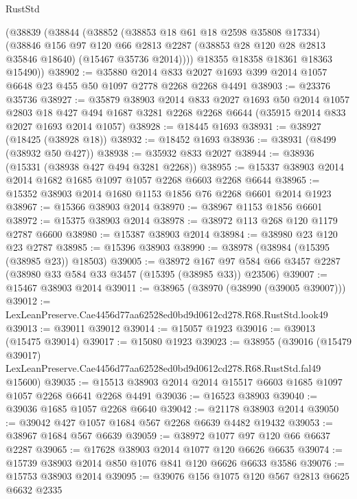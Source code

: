 \begin{lexlean}{RustStd}
\begin{coremodule}
      (@38839
        (@38844
          (@38852
            (@38853 @18 @61 @18 @2598 @35808 @17334)
            (@38846
              @156
              @97
              @120
              @66
              @2813
              @2287
              (@38853 @28 @120 @28 @2813 @35846 @18640)
              (@15467 @35736 @2014))))
        @18355
        @18358
        @18361
        @18363
        @15490))
@38902 := @35880
    @2014
    @833
    @2027
    @1693
    @399
    @2014
    @1057
    @6648
    @23
    @455
    @50
    @1097
    @2778
    @2268
    @2268
    @4491
@38903 := @23376 @35736
@38927 := @35879
    @38903
    @2014
    @833
    @2027
    @1693
    @50
    @2014
    @1057
    @2803
    @18
    @427
    @494
    @1687
    @3281
    @2268
    @2268
    @6644
    (@35915 @2014 @833 @2027 @1693 @2014 @1057)
@38928 := @18445 @1693
@38931 := @38927 (@18425 (@38928 @18))
@38932 := @18452 @1693
@38936 := @38931 (@8499 (@38932 @50 @427))
@38938 := @35932 @833 @2027
@38944 := @38936 (@15331 (@38938 @427 @494 @3281 @2268))
@38955 := @15337 @38903 @2014 @2014 @1682 @1685 @1097 @1057 @2268 @6603 @2268 @6644
@38965 := @15352 @38903 @2014 @1680 @1153 @1856 @76 @2268 @6601 @2014 @1923
@38967 := @15366 @38903 @2014
@38970 := @38967 @1153 @1856 @6601
@38972 := @15375 @38903 @2014
@38978 := @38972 @113 @268 @120 @1179 @2787 @6600
@38980 := @15387 @38903 @2014
@38984 := @38980 @23 @120 @23 @2787
@38985 := @15396 @38903
@38990 := @38978 (@38984 (@15395 (@38985 @23)) @18503)
@39005 := @38972
    @167
    @97
    @584
    @66
    @3457
    @2287
    (@38980 @33 @584 @33 @3457 (@15395 (@38985 @33)) @23506)
@39007 := @15467 @38903 @2014
@39011 := @38965 (@38970 (@38990 (@39005 @39007)))
@39012 := LexLeanPreserve.Cae4456d77aa62528ed0bd9d0612cd278.R68.RustStd.look49
@39013 := @39011 @39012
@39014 := @15057 @1923
@39016 := @39013 (@15475 @39014)
@39017 := @15080 @1923
@39023 := @38955
    (@39016
      (@15479 @39017)
      LexLeanPreserve.Cae4456d77aa62528ed0bd9d0612cd278.R68.RustStd.fal49
      @15600)
@39035 := @15513 @38903 @2014 @2014 @15517 @6603 @1685 @1097 @1057 @2268 @6641 @2268 @4491
@39036 := @16523 @38903
@39040 := @39036 @1685 @1057 @2268 @6640
@39042 := @21178 @38903 @2014
@39050 := @39042 @427 @1057 @1684 @567 @2268 @6639 @4482 @19432
@39053 := @38967 @1684 @567 @6639
@39059 := @38972 @1077 @97 @120 @66 @6637 @2287
@39065 := @17628 @38903 @2014 @1077 @120 @6626 @6635
@39074 := @15739 @38903 @2014 @850 @1076 @841 @120 @6626 @6633 @3586
@39076 := @15753 @38903 @2014
@39095 := @39076
    @156
    @1075
    @120
    @567
    @2813
    @6625
    @6632
    @2335

\end{coremodule}
\end{lexlean}
